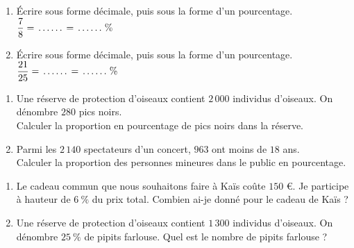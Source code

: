 {%
\begin{Exercice}
\leavevmode\vspace{-\baselineskip}
\begin{enumerate}
	\item Écrire sous forme décimale, puis sous la forme d'un pourcentage. $\dfrac{7}{8}=\makebox[.08\linewidth]{\dotfill}=\makebox[.08\linewidth]{\dotfill}\,\%$
	\item Écrire sous forme décimale, puis sous la forme d'un pourcentage. $\dfrac{21}{25}=\makebox[.08\linewidth]{\dotfill}=\makebox[.08\linewidth]{\dotfill}\,\%$
\end{enumerate}
\end{Exercice}



\begin{Exercice}
\leavevmode\vspace{-\baselineskip}
\begin{enumerate}
	\item Une réserve de protection d'oiseaux contient $2\,000$ individus d'oiseaux. On dénombre $280$ pics noirs. \\Calculer la proportion en pourcentage de pics noirs dans la réserve.
	\item Parmi les $2\,140$ spectateurs d'un concert, $963$ ont moins de $18$ ans. \\Calculer la proportion des personnes mineures dans le public en pourcentage.
\end{enumerate}
\end{Exercice}

\begin{Exercice}
\leavevmode\vspace{-\baselineskip}
\begin{enumerate}
	\item Le cadeau commun que nous souhaitons faire à Kaïs coûte $150$ €. Je participe à hauteur de $6~\%$ du prix total. Combien ai-je donné pour le cadeau de Kaïs ?
	\item Une réserve de protection d'oiseaux contient $1\,300$ individus d'oiseaux. On dénombre $25~\%$ de pipits farlouse. Quel est le nombre de pipits farlouse ?
\end{enumerate}
\end{Exercice}

}
